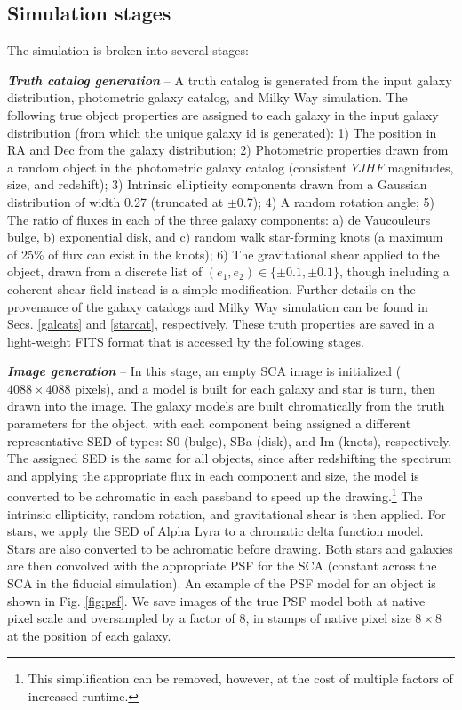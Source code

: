 \documentclass[aps,prd, amsmath,amssymb,superscriptaddress,showkeys,nofootinbib,reprint,preprintnumbers]{revtex4-1}
\begin{document}
\subsection{Simulation stages}\label{stages}

The simulation is broken into several stages:

\textbf{\textit{Truth catalog generation}} -- A truth catalog is generated from the input galaxy distribution, photometric galaxy catalog, and Milky Way simulation. 
The following true object properties are assigned to each galaxy in the input galaxy distribution (from which the unique galaxy id is generated): 
1) The position in RA and Dec from the galaxy distribution; 
2) Photometric properties drawn from a random object in the photometric galaxy catalog (consistent $YJHF$ magnitudes, size, and redshift); 
3) Intrinsic ellipticity components drawn from a Gaussian distribution of width 0.27 (truncated at $\pm$0.7); 
4) A random rotation angle; 
5) The ratio of fluxes in each of the three galaxy components: a) de Vaucouleurs bulge, b) exponential disk, and c) random walk star-forming knots (a maximum of 25\% of flux can exist in the knots); 
6) The gravitational shear applied to the object, drawn from a discrete list of $(e_1, e_2) \in \{\pm 0.1, \pm 0.1\}$, though including a coherent shear field instead is a simple modification. 
Further details on the provenance of the galaxy catalogs and Milky Way simulation can be found in Secs. \ref{galcats} and \ref{starcat}, respectively. 
These truth properties are saved in a light-weight FITS format that is accessed by the following stages.

\textbf{\textit{Image generation}} -- In this stage, an empty SCA image is initialized ($4088\times4088$ pixels), and a model is built for each galaxy and star is turn, then drawn into the image. 
The galaxy models are built chromatically from the truth parameters for the object, with each component being assigned a different representative SED of types: S0 (bulge), SBa (disk), and Im (knots), respectively. 
The assigned SED is the same for all objects, since after redshifting the spectrum and applying the appropriate flux in each component and size, the model is converted to be achromatic in each passband to speed up the drawing.\footnote{This simplification can be removed, however, at the cost of multiple factors of increased runtime.}
The intrinsic ellipticity, random rotation, and gravitational shear is then applied.
For stars, we apply the SED of Alpha Lyra to a chromatic delta function model. 
Stars are also converted to be achromatic before drawing.
Both stars and galaxies are then convolved with the appropriate PSF for the SCA (constant across the SCA in the fiducial simulation). An example of the PSF model for an object is shown in Fig. \ref{fig:psf}. We save images of the true PSF model both at native pixel scale and oversampled by a factor of 8, in stamps of native pixel size $8\times 8$ at the position of each galaxy.
\end{document}
